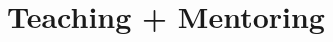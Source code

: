\documentclass[letterpaper]{deedy-resume} %
\begin{document}


%
%
%
%
%
%
%  
%  
%
%
%
%
%


\section{Teaching + Mentoring}

\vspace{0.2cm}
\end{document}
